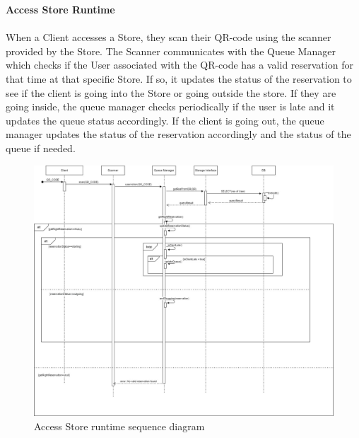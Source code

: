 \documentclass[a4paper, 12pt, oneside, table]{article}
\begin{document}
\textbf{Access Store Runtime}\\
\\
When a Client accesses a Store, they scan their QR-code using the scanner provided by the Store. The Scanner communicates with the Queue Manager which checks if the User associated with the QR-code has a valid reservation for that time at that specific Store. If so, it updates the status of the reservation to see if the client is going into the Store or going outside the store. If they are going inside, the queue manager checks periodically if the user is late and it updates the queue status accordingly. If the client is going out, the queue manager updates the status of the reservation accordingly and the status of the queue if needed.
\begin{figure}[H]
\centering
	\centering
  	\includegraphics[height=0.5\textheight, scale=0.5, keepaspectratio]{img/seq_diag/AccessStore.jpg}
	\caption{Access Store runtime sequence diagram}
 	\label{accessStoreRunTime}
\end{figure}
\end{document}
